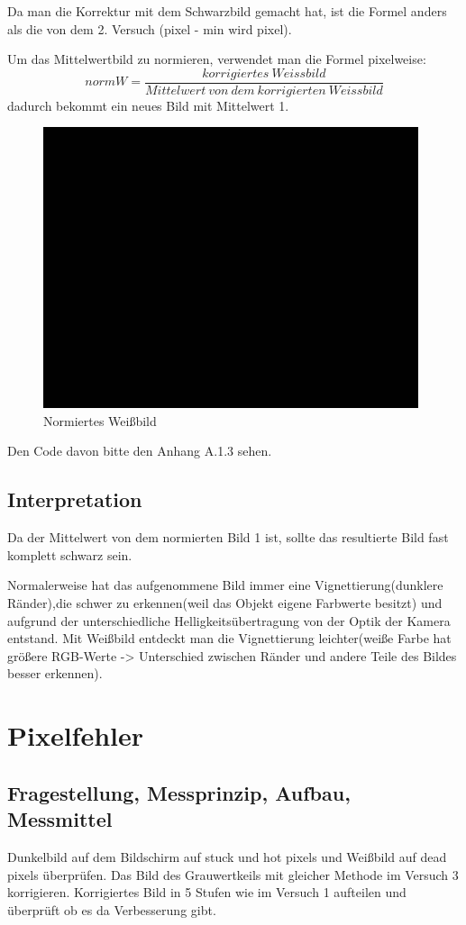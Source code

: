 \documentclass[12pt, oneside, a4paper, \docLanguage]{report}
\begin{document}
	Da man die Korrektur mit dem Schwarzbild gemacht hat, ist die Formel anders als die von dem 2. Versuch (pixel - min wird pixel).
	
	Um das Mittelwertbild zu normieren, verwendet man die Formel pixelweise:
	$$normW = \frac{korrigiertes\:Weissbild}{Mittelwert\:von\:dem\:korrigierten\:Weissbild}$$
dadurch bekommt ein neues Bild mit Mittelwert 1.
\begin{figure}[H]
	\centering\small
	\includegraphics[width=11cm]{normW.png}
	\caption{Normiertes Weißbild}
\end{figure}
Den Code davon bitte den Anhang A.1.3 sehen.
\section{Interpretation}
\label{chap:VERSUCH_3_INTERPRETATION}
Da der Mittelwert von dem normierten Bild 1 ist, sollte das resultierte Bild fast komplett schwarz sein. 

Normalerweise hat das aufgenommene Bild immer eine Vignettierung(dunklere Ränder),die schwer zu erkennen(weil das Objekt eigene Farbwerte besitzt) und aufgrund der unterschiedliche Helligkeitsübertragung von der Optik der Kamera entstand. Mit Weißbild entdeckt man die Vignettierung leichter(weiße Farbe hat größere RGB-Werte -> Unterschied zwischen Ränder und andere Teile des Bildes besser erkennen).
%
\chapter{Pixelfehler}
\label{chap:VERSUCH_4}

\section{Fragestellung, Messprinzip, Aufbau, Messmittel}
\label{chap:VERSUCH_4_FRAGESTELLUNG}
Dunkelbild auf dem Bildschirm auf stuck und hot pixels und  Weißbild auf dead pixels überprüfen.
Das Bild des Grauwertkeils mit gleicher Methode im Versuch 3 korrigieren. Korrigiertes Bild in 5 Stufen wie im Versuch 1 aufteilen und überprüft ob es da Verbesserung gibt.
\end{document}
